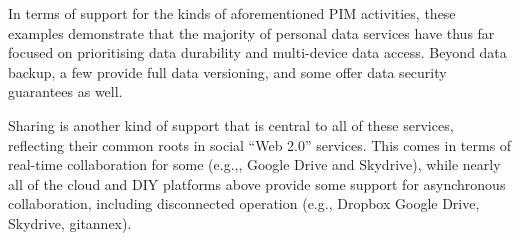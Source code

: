 \documentclass[graybox]{svmult}
\begin{document}



In terms of support for the kinds of aforementioned PIM activities, these examples demonstrate that the majority of personal data services have thus far focused on prioritising data durability and multi-device data access.  Beyond data backup, a few provide full data versioning, and some offer data security guarantees as well. 

Sharing is another kind of support that is central to all of these services, reflecting their common roots in social “Web 2.0”  services.  This comes in terms of real-time collaboration for some (e.g.,, Google Drive and Skydrive), while nearly all of the cloud and DIY platforms above  provide some support for asynchronous collaboration, including disconnected operation (e.g., Dropbox Google Drive, Skydrive, gitannex).
\end{document}
